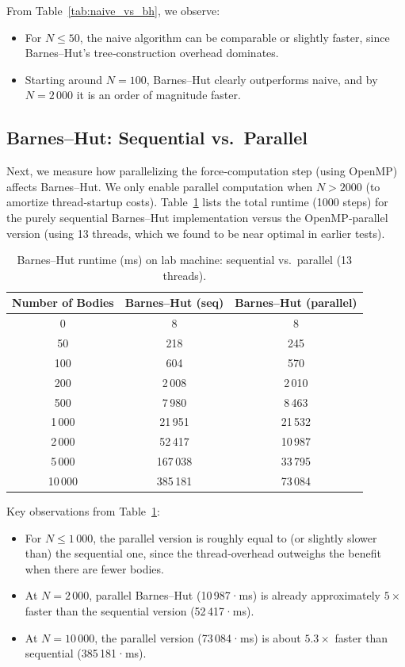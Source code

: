 \documentclass{article}
\begin{document}
\noindent
From Table~\ref{tab:naive_vs_bh}, we observe:
\begin{itemize}
  \item For $N \le 50$, the naive algorithm can be comparable or slightly faster, since Barnes–Hut’s tree‐construction overhead dominates.
  \item Starting around $N = 100$, Barnes–Hut clearly outperforms naive, and by $N=2\,000$ it is an order of magnitude faster.
\end{itemize}

\subsection{Barnes–Hut: Sequential vs.\ Parallel}

Next, we measure how parallelizing the force‐computation step (using OpenMP) affects Barnes–Hut.  We only enable parallel computation when $N>2000$ (to amortize thread‐startup costs).  Table~\ref{tab:bh_seq_vs_par} lists the total runtime (1000 steps) for the purely sequential Barnes–Hut implementation versus the OpenMP‐parallel version (using 13 threads, which we found to be near optimal in earlier tests).

\begin{table}[H]
    \centering
    \begin{tabular}{|c|c|c|}
    \hline
    \textbf{Number of Bodies} & \textbf{Barnes–Hut (seq)} & \textbf{Barnes–Hut (parallel)} \\
    \hline
    0      &       8   &       8    \\ 
    50     &     218   &     245    \\ 
    100    &     604   &     570    \\ 
    200    &   2\,008  &   2\,010   \\ 
    500    &   7\,980  &   8\,463   \\ 
    1\,000 &  21\,951  &  21\,532   \\ 
    2\,000 &  52\,417  &  10\,987   \\ 
    5\,000 & 167\,038  &  33\,795   \\ 
    10\,000& 385\,181  &  73\,084   \\ 
    \hline
    \end{tabular}
    \caption{Barnes–Hut runtime (ms) on lab machine: sequential vs.\ parallel (13 threads).}
    \label{tab:bh_seq_vs_par}
\end{table}

\noindent
Key observations from Table~\ref{tab:bh_seq_vs_par}:
\begin{itemize}
  \item For $N \le 1\,000$, the parallel version is roughly equal to (or slightly slower than) the sequential one, since the thread‐overhead outweighs the benefit when there are fewer bodies.
  \item At $N = 2\,000$, parallel Barnes–Hut (10\,987·ms) is already approximately $5\times$ faster than the sequential version (52\,417·ms).
  \item At $N = 10\,000$, the parallel version (73\,084·ms) is about $5.3\times$ faster than sequential (385\,181·ms).
\end{itemize}
\end{document}
